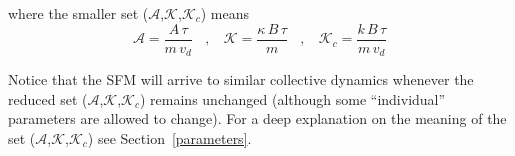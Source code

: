 \documentclass[preprint,12pt]{elsarticle}
\begin{document}
\noindent where the smaller set ($\mathcal{A}$,$\mathcal{K}$,$\mathcal{K}_c$) 
means\\

\begin{equation}
 \mathcal{A}=\displaystyle\frac{A\,\tau}{m\,v_d}\ \ \ \ , \ \ \ \ 
 \mathcal{K}=\displaystyle\frac{\kappa\,B\,\tau}{m}\ \ \ \ , \ \ \ \
 \mathcal{K}_c=\displaystyle\frac{k\,B\,\tau}{m\,v_d}
\end{equation}

Notice that the SFM will arrive to similar collective dynamics whenever the 
reduced set ($\mathcal{A}$,$\mathcal{K}$,$\mathcal{K}_c$) remains unchanged 
(although some ``individual'' parameters are allowed to change). For a deep 
explanation on the meaning  of the set 
($\mathcal{A}$,$\mathcal{K}$,$\mathcal{K}_c$) see Section~\ref{parameters}. \\








\end{document}

